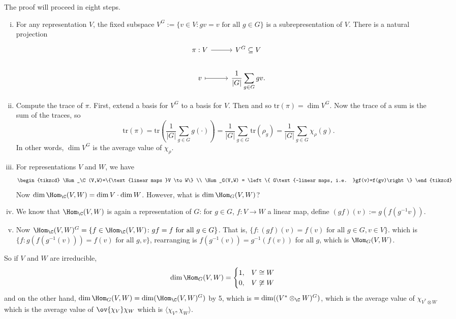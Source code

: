 \pf The proof will proceed in eight steps.
	\begin{enumerate}[(i)]
	\item For any representation $V$, the fixed subspace $V^G:=\{v \in V \colon gv=v \text{ for all }g \in G\}$ is a subrepresentation of $V$. There is a natural projection
		\[
		\begin{tikzcd}
		\pi: V \arrow{r} & V^G \subseteq V \\
		v \arrow[mapsto]{r} & \displaystyle\dfrac{1}{|G|} \sum_{g \in G} gv.
		\end{tikzcd}
		\]
	\item Compute the trace of $\pi$. First, extend a basis for $V^G$ to a basis for $V$. Then
		and so $\text{tr}(\pi)= \dim V^G$. Now the trace of a sum is the sum of the traces, so 
			\[
			\text{tr}(\pi)= \text{tr}\left( \dfrac{1}{|G|} \sum_{g \in G} g(\cdot) \right) = \dfrac{1}{|G|} \sum_{g \in G} \text{tr}(\rho_g)= \dfrac{1}{|G|} \sum_{g \in G} \chi_\rho(g).
			\]
		In other words, $\dim V^G$ is the average value of $\chi_\rho$. 
	
	\item For representations $V$ and $W$, we have
		\[
		\begin{tikzcd}
		\Hom_\C(V,W)=\{\text{linear maps }V \to W\} \\ %
		\Hom_G(V,W) = \left\{ G\text{-linear maps, i.e. }gf(v)=f(gv)\right\}
		\end{tikzcd}
		\] 
	Now $\dim \Hom_\C(V,W)= \dim V \cdot \dim W$. However, what is $\dim \Hom_G(V,W)$? 
	
	
	\item We know that $\Hom_\C(V,W)$ is again a representation of $G$: for $g \in G$, $f: V \to W$ a linear map, define $(gf)(v):= g(f(g^{-1}v))$. %
	
	\item Now $\Hom_\C(V,W)^G= \{ f \in \Hom_\C(V,W) \colon gf=f \text{ for all }g \in G\}$. That is, $\{ f \colon (gf)(v)=f(v) \text{ for all }g \in G, v \in V\}$. which is $\{f \colon g(f(g^{-1}(v)))=f(v) \text{ for all }g,v\}$, rearranging is $f(g^{-1}(v))= g^{-1}(f(v))$ for all $g$, which is $\Hom_G(V,W)$. 
	\end{enumerate}
So if $V$ and $W$ are irreducible, 
	\[
	\dim \Hom_G(V,W)= 
	\begin{cases}
	1, & V \cong W \\
	0, & V \not\cong W
	\end{cases}
	\]
and on the other hand, $\dim \Hom_G(V,W)= \dim(\Hom_\C(V,W)^G)$ by 5, which is $=\dim((V^* \otimes_\C W)^G)$, which is the average value of $\chi_{V^* \otimes W}$ which is the average value of $\ov{\chi_V} \chi_W$ which is $\langle \chi_V, \chi_W \rangle$. 








